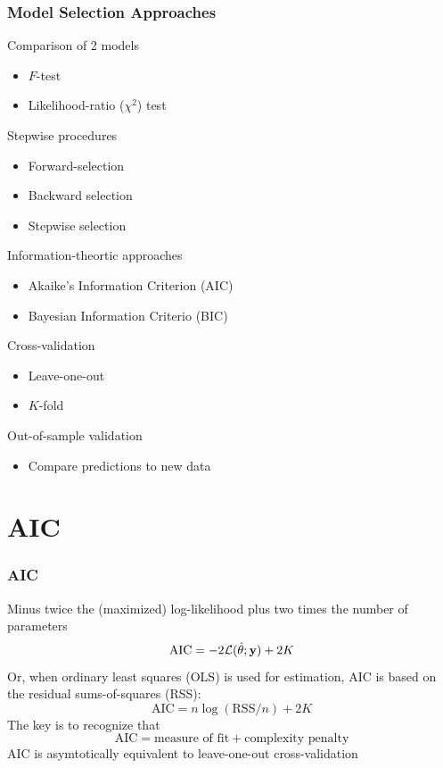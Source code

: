 \documentclass[color=usenames,dvipsnames]{beamer}\usepackage[]{graphicx}\usepackage[]{color}
\begin{document}
\begin{frame}
  \frametitle{Model Selection Approaches}
  Comparison of 2 models
  \begin{itemize}
    \item $F$-test
    \item Likelihood-ratio ($\chi^2$) test
  \end{itemize}
  \pause
  Stepwise procedures
  \begin{itemize}
    \item Forward-selection
    \item Backward selection
    \item Stepwise selection
  \end{itemize}
  \pause
  Information-theortic approaches
  \begin{itemize}
    \item Akaike's Information Criterion (AIC)
    \item Bayesian Information Criterio (BIC)
  \end{itemize}
  \pause
  Cross-validation
  \begin{itemize}
    \item Leave-one-out
    \item $K$-fold %
  \end{itemize}
  \pause
  Out-of-sample validation
  \begin{itemize}
    \item Compare predictions to new data
  \end{itemize}
\end{frame}




\section{AIC}





\begin{frame}[fragile]
  \frametitle{AIC}
  \large
  Minus twice the (maximized) log-likelihood plus two times the number of
  parameters
\[
 \mathrm{AIC} = -2\mathcal{L}(\hat{\theta} ; {\bf y}) + 2K
\]
  \pause
  Or, when ordinary least squares (OLS) is used for estimation, AIC is
  based on the residual sums-of-squares (RSS):
\[
 \mathrm{AIC} = n\log(\mathrm{RSS}/n) + 2K
\]
 \pause
 The key is to recognize that
\[
 \mathrm{AIC} = \text{measure of fit} + \text{complexity penalty}
\]
  \pause
  AIC is asymtotically equivalent to leave-one-out cross-validation \\
\end{frame}
\end{document}
